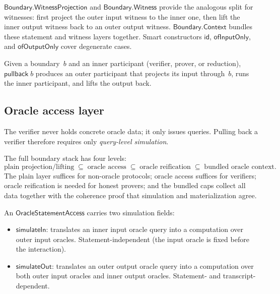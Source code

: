 $\mathsf{Boundary.WitnessProjection}$ and $\mathsf{Boundary.Witness}$ provide
the analogous split for witnesses: first project the outer input witness to the
inner one, then lift the inner output witness back to an outer output witness.
$\mathsf{Boundary.Context}$ bundles these statement and witness layers together.
Smart constructors $\mathsf{id}$, $\mathsf{ofInputOnly}$, and
$\mathsf{ofOutputOnly}$ cover degenerate cases.

\begin{definition}[Pullback]
  \label{int:boundary-pullback}
  Given a boundary~$b$ and an inner participant (verifier, prover, or
  reduction), $\mathsf{pullback}\;b$ produces an outer participant that
  projects its input through~$b$, runs the inner participant, and lifts
  the output back.
\end{definition}

\subsection{Oracle access layer}

The verifier never holds concrete oracle data; it only issues queries.
Pulling back a verifier therefore requires only \emph{query-level simulation}.

\begin{remark}
  The full boundary stack has four levels:
  \[
    \text{plain projection/lifting}
    \;\subseteq\;
    \text{oracle access}
    \;\subseteq\;
    \text{oracle reification}
    \;\subseteq\;
    \text{bundled oracle context}.
  \]
  The plain layer suffices for non-oracle protocols; oracle access suffices for
  verifiers; oracle reification is needed for honest provers; and the bundled
  caps collect all data together with the coherence proof that simulation and
  materialization agree.
\end{remark}

\begin{definition}[OracleStatementAccess]
  \label{int:oracle-statement-access}
  An $\mathsf{OracleStatementAccess}$ carries two simulation fields:
  \begin{itemize}
    \item $\mathsf{simulateIn}$: translates an inner input oracle query into a
      computation over outer input oracles.  Statement-independent (the input
      oracle is fixed before the interaction).
    \item $\mathsf{simulateOut}$: translates an outer output oracle query into a
      computation over both outer input oracles and inner output oracles.
      Statement- and transcript-dependent.
  \end{itemize}
\end{definition}

